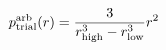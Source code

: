 \documentclass[12pt]{article}
\begin{document}
\begin{displaymath}
p_{\rm trial}^{\rm arb}(r) = {{3}\over{r_{\rm high}^{3} - r_{\rm low}^{3}}} r^2
\end{displaymath}
\end{document}
